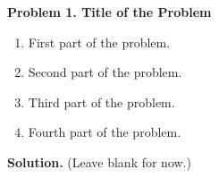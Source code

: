 \documentclass[11pt]{article}
\begin{document}
	
	\noindent\textbf{Problem 1. Title of the Problem}
	
	\begin{enumerate}[label=\textbf{(\alph*)}, leftmargin=1.2cm]
		\item First part of the problem.
		\item Second part of the problem.
		\item Third part of the problem.
		\item Fourth part of the problem.
	\end{enumerate}
	
	\vspace{1em}
	\noindent\textbf{Solution.} (Leave blank for now.)
	
\end{document}
